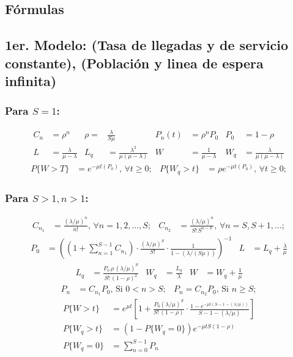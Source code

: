 \documentclass[letterpaper, 12pt]{article}
\begin{document}
\newpage
\begin{justify}
    \section*{Fórmulas}
    \subsection*{1er. Modelo: (Tasa de llegadas y de servicio constante), (Población y linea de espera infinita)}
    \subsubsection*{Para \(S=1\):}
    \large{
    \begin{align*}
C_n&=\rho ^n &\rho =&\frac{\lambda}{S\mu}&P_n(t)&= \rho ^nP_0&P_0&=1-\rho\\
L&=\frac{\lambda}{\mu -\lambda}&L_q&=\frac{\lambda ^2}{\mu (\mu -\lambda)}&W&=\frac{1}{\mu -\lambda}&W_q&=\frac{\lambda}{\mu (\mu -\lambda)}
    \end{align*}
    \begin{align*}
P\{W>T\}&=e^{-\mu t(P_0)},\, \forall t\geq 0;&P\{W_q>t\}&=\rho e^{-\mu t(P_0)},\, \forall t\geq 0;
    \end{align*}
    }
    \subsubsection*{Para \(S>1, n>1\):}
    \large{        
    \begin{align*}
C_{n_1}&=\frac{(\lambda/\mu)^n}{n!},\, \forall n=1,2,...,S;&C_{n_2}&=\frac{(\lambda/\mu)^n}{S!\, S^{n-S}},\, \forall n=S,S+1,...;
    \end{align*}
    \begin{align*}
P_0&=\left(\left(1+\sum_{n=1}^{S-1} C_{n_1}\right)\cdot \frac{(\lambda/\mu)^S}{S!}\cdot \frac{1}{1-(\lambda/(S\mu))}\right)^{-1}&L&=L_q+\frac{\lambda}{\mu}
    \end{align*}
    }
    \large{
    \begin{align*}
L_q&=\frac{P_o\,\rho\,(\lambda/\mu)^S}{S!\,(1-\rho)^2}&W_q&=\frac{L_q}{\lambda}&W&=W_q+\frac{1}{\mu}
    \end{align*}
    }
    \large{
    \begin{align*}
P_n&=C_{n_1} P_0,\, \text{Si } 0<n>S;&P_n=C_{n_2}P_0,\, \text{Si } n\geq S;
    \end{align*}
    }
    \large{
    \begin{align*}
P\{W>t\}&=e^{\mu t}\left[1+\frac{P_0(\lambda/\mu)^S}{S!\,(1-\rho)}\cdot \frac{1-e^{-\mu t(S-1-(\lambda/\mu))}}{S-1-(\lambda/\mu)}\right]\\
P\{W_q>t\}&=\left(1-P\{W_q=0\}\right)e^{-\mu tS(1-\rho)}\\
P\{W_q=0\}&=\sum_{n=0}^{S-1} P_n
    \end{align*}
    }
    \newpage

\end{justify}
\end{document}

